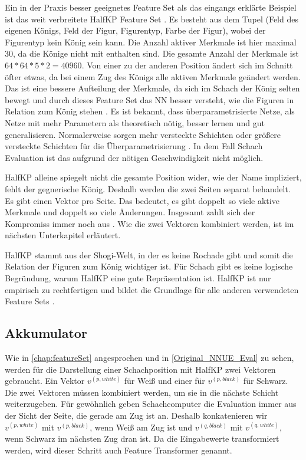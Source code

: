 Ein in der Praxis besser geeignetes Feature Set als das eingangs erklärte Beispiel ist das weit verbreitete HalfKP Feature Set \cite{YNasu2018,StockfishNNUE}. Es besteht aus dem Tupel (Feld des eigenen Königs, Feld der Figur, Figurentyp, Farbe der Figur), wobei der Figurentyp kein König sein kann. Die Anzahl aktiver Merkmale ist hier maximal 30, da die Könige nicht mit enthalten sind. Die gesamte Anzahl der Merkmale ist $64*64*5*2=40960$. Von einer zu der anderen Position ändert sich im Schnitt öfter etwas, da bei einem Zug des Königs alle aktiven Merkmale geändert werden. Das ist eine bessere Aufteilung der Merkmale, da sich im Schach der König selten bewegt und durch dieses Feature Set das \ac{NN} besser versteht, wie die Figuren in Relation zum König stehen \cite{StockfishNNUE}. Es ist bekannt, dass überparametrisierte Netze, als Netze mit mehr Parametern als theoretisch nötig, besser lernen und gut generalisieren. Normalerweise sorgen mehr versteckte Schichten oder größere versteckte Schichten für die Überparametrisierung \cite{Du2018, allen2019learning}. In dem Fall Schach Evaluation ist das aufgrund der nötigen Geschwindigkeit nicht möglich.

HalfKP alleine spiegelt nicht die gesamte Position wider, wie der Name impliziert, fehlt der gegnerische König. Deshalb werden die zwei Seiten separat behandelt. Es gibt einen Vektor pro Seite. Das bedeutet, es gibt doppelt so viele aktive Merkmale und doppelt so viele Änderungen. Insgesamt zahlt sich der Kompromiss immer noch aus \cite{StockfishNNUE}. Wie die zwei Vektoren kombiniert werden, ist im nächsten Unterkapitel erläutert.

HalfKP stammt aus der Shogi-Welt, in der es keine Rochade gibt und somit die Relation der Figuren zum König wichtiger ist. Für Schach gibt es keine logische Begründung, warum HalfKP eine gute Repräsentation ist. HalfKP ist nur empirisch zu rechtfertigen und bildet die Grundlage für alle anderen verwendeten Feature Sets \cite{StockfishNNUE}.

\subsection{Akkumulator}
\label{chap:accumulator}

Wie in \autoref{chap:featureSet} angesprochen und in \autoref{Original_NNUE_Eval} zu sehen, werden für die Darstellung einer Schachposition mit HalfKP zwei Vektoren gebraucht. Ein Vektor $v^{(p,white)}$ für Weiß und einer für $v^{(p,black)}$ für Schwarz. Die zwei Vektoren müssen kombiniert werden, um sie in die nächste Schicht weiterzugeben. Für gewöhnlich geben Schachcomputer die Evaluation immer aus der Sicht der Seite, die gerade am Zug ist an. Deshalb konkatenieren wir $v^{(p,white)}$ mit $v^{(p,black)}$, wenn Weiß am Zug ist und $v^{(q,black)}$ mit $v^{(q,white)}$, wenn Schwarz im nächsten Zug dran ist. Da die Eingabewerte transformiert werden, wird dieser Schritt auch Feature Transformer genannt.

